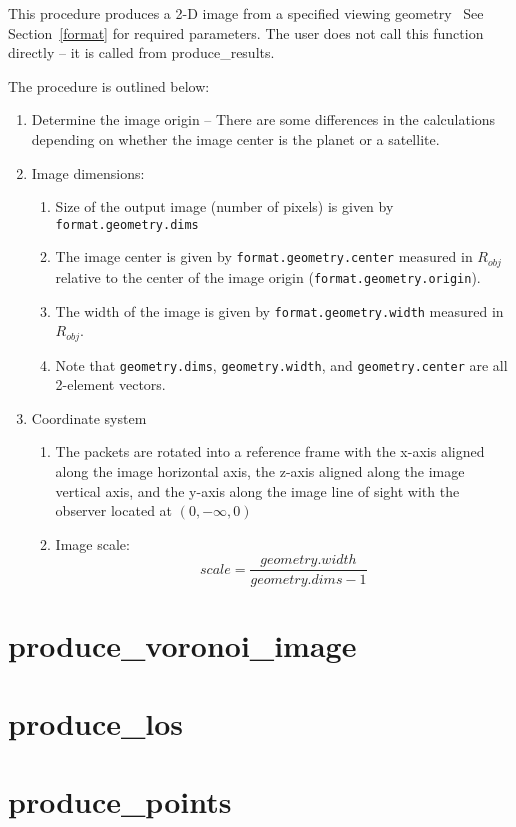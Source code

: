 \documentclass[11pt]{article}
\begin{document}
This procedure produces a 2-D image from a specified viewing geometry
\rarrow\ See Section~\ref{format} for required parameters. The user does
not call this function directly -- it is called from
{\color{blue}produce\_results}.

The procedure is outlined below:
\begin{enumerate}
\item Determine the image origin -- There are some differences in the
calculations depending on whether the image center is the planet or a
satellite.

\item Image dimensions:
  \begin{enumerate}
  \item Size of the output image (number of pixels) is given by
  \texttt{format.geometry.dims}
  \item The image center is given by \texttt{format.geometry.center} measured  
  in $R_{obj}$ relative to the center of the image origin
  (\texttt{format.geometry.origin}). 
  \item The width of the image is given by \texttt{format.geometry.width}
  measured in $R_{obj}$.
  \item Note that \texttt{geometry.dims}, \texttt{geometry.width}, and
  \texttt{geometry.center} are all 2-element vectors.
  \end{enumerate}

\item Coordinate system
  \begin{enumerate}
  \item The packets are rotated into a reference frame with the x-axis aligned
  along the image horizontal axis, the z-axis aligned along the image vertical
  axis, and the y-axis along the image line of sight with the observer located
  at $(0,-\infty,0)$
  \item Image scale: 
  \begin{equation}
  scale = \frac{geometry.width}{geometry.dims-1}
  \end{equation}
  \end{enumerate}

\end{enumerate}

\section{produce\_voronoi\_image \label{voronoiimage}}

\section{produce\_los \label{los}}

\section{produce\_points \label{points}}
\end{document}
